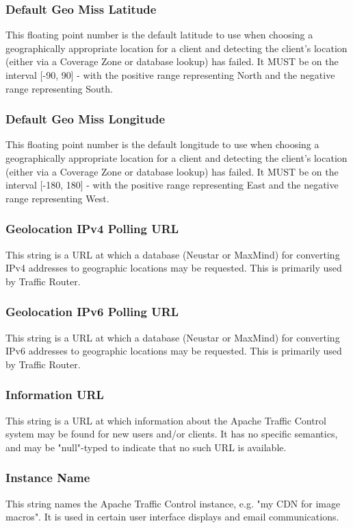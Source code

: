 \subsubsection{Default Geo Miss Latitude}
This floating point number is the default latitude to use when choosing a
geographically appropriate location for a client and detecting the client's
location (either via a Coverage Zone or database lookup) has failed. It MUST be
on the interval [-90, 90] - with the positive range representing North and the
negative range representing South.

\subsubsection{Default Geo Miss Longitude}
This floating point number is the default longitude to use when choosing a
geographically appropriate location for a client and detecting the client's
location (either via a Coverage Zone or database lookup) has failed. It MUST be
on the interval [-180, 180] - with the positive range representing East and the
negative range representing West.

\subsubsection{Geolocation IPv4 Polling URL}
This string is a URL at which a database (Neustar or MaxMind) for converting
IPv4 addresses to geographic locations may be requested. This is primarily used
by Traffic Router.

\subsubsection{Geolocation IPv6 Polling URL}
This string is a URL at which a database (Neustar or MaxMind) for converting
IPv6 addresses to geographic locations may be requested. This is primarily used
by Traffic Router.

\subsubsection{Information URL}
This string is a URL at which information about the Apache Traffic Control
system may be found for new users and/or clients. It has no specific semantics,
and may be "null"-typed to indicate that no such URL is available.

\subsubsection{Instance Name}
This string names the Apache Traffic Control instance, e.g. "my CDN for image
macros". It is used in certain user interface displays and email communications.

